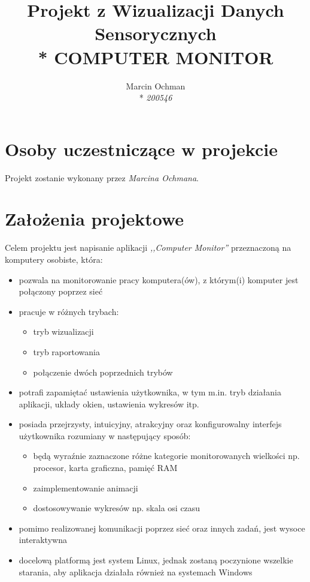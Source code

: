 \documentclass[a4paper]{article}
\author{Marcin Ochman \\* \textit{200546}}
\title{ Projekt z Wizualizacji Danych Sensorycznych \\* 
	\huge{\uppercase{\textbf{Computer Monitor}}}}
\date{}
\begin{document}
	\maketitle
	
	\section{Osoby uczestniczące w projekcie}
		Projekt zostanie wykonany przez \textit{Marcina Ochmana}.
	
	
	\section{Założenia projektowe}
		Celem projektu jest napisanie aplikacji \textit{,,Computer Monitor''} przeznaczoną na komputery osobiste, która:
	\begin{itemize}
		\item pozwala na monitorowanie pracy komputera(ów), z którym(i) komputer jest połączony poprzez sieć
		\item pracuje w różnych trybach:
		\begin{itemize}
			\item tryb wizualizacji
			\item tryb raportowania
			\item połączenie dwóch poprzednich trybów
		\end{itemize}
		\item potrafi zapamiętać ustawienia użytkownika, w tym m.in. tryb działania aplikacji, układy okien, ustawienia wykresów itp.
		\item posiada przejrzysty, intuicyjny, atrakcyjny oraz konfigurowalny interfejs użytkownika rozumiany w następujący sposób:
		\begin{itemize}
			\item będą wyraźnie zaznaczone różne kategorie monitorowanych wielkości np. procesor, karta graficzna, pamięć \uppercase{ram}
			\item zaimplementowanie animacji
			\item dostosowywanie wykresów np. skala osi czasu
			 
		\end{itemize}
		\item pomimo realizowanej komunikacji poprzez sieć oraz innych zadań, jest wysoce 
		interaktywna
		\item docelową platformą jest system Linux, jednak zostaną poczynione wszelkie starania, aby aplikacja działała również na systemach Windows
	\end{itemize}
	
\end{document}
